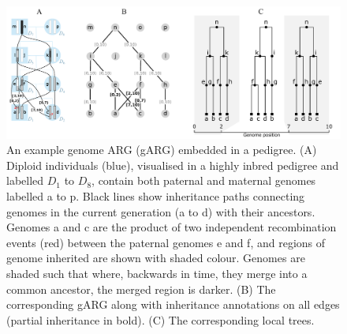 \documentclass{article}
\begin{document}
\begin{figure}
\begin{center}
    \includegraphics[width=\textwidth]{illustrations/arg-in-pedigree}
\end{center}
\caption{\label{fig-arg-in-pedigree}
An example genome ARG (gARG) embedded in a pedigree.
(A) Diploid individuals (blue), visualised in a highly inbred pedigree and
labelled $D_1$ to $D_8$,
contain both paternal and maternal  genomes
labelled \textsf{a} to \textsf{p}. Black lines show inheritance paths connecting
genomes in the current generation (\textsf{a} to \textsf{d}) with their ancestors.
Genomes \textsf{a} and \textsf{c} are the product of two independent
recombination events (red) between
the paternal genomes \textsf{e}
and \textsf{f}, and regions of genome inherited are shown with shaded colour.
Genomes are shaded such that where, backwards in time,
they merge into a common ancestor, the merged region is darker.
(B) The corresponding gARG along with inheritance annotations on all edges
(partial inheritance in bold).
(C) The corresponding local trees.
}
\end{figure}
\end{document}
